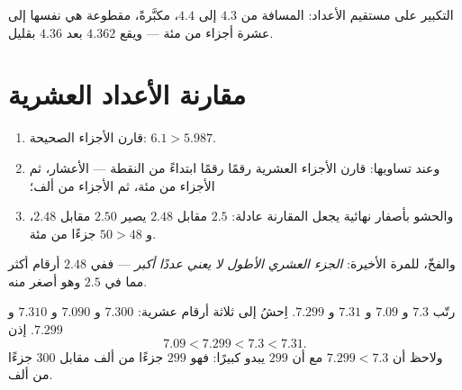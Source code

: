 \begin{omfigure}

{\small التكبير على مستقيم الأعداد: المسافة من $4.3$ إلى $4.4$،
مكبَّرةً، مقطوعة هي نفسها إلى عشرة أجزاء من مئة --- ويقع $4.362$
بعد $4.36$ بقليل.}
\end{omfigure}

\section{مقارنة الأعداد العشرية}

\begin{method}\label{met:g5:decimals:compare}
\begin{enumerate}
  \item قارن الأجزاء الصحيحة: $6.1 > 5.987$.
  \item وعند تساويها: قارن الأجزاء العشرية رقمًا رقمًا
        ابتداءً من النقطة --- الأعشار، ثم الأجزاء من مئة، ثم
        الأجزاء من ألف؛
  \item والحشو بأصفار نهائية يجعل المقارنة عادلة:
        $2.5$ مقابل $2.48$ يصير $2.50$ مقابل $2.48$، و $50 > 48$
        جزءًا من مئة.
\end{enumerate}
والفخّ، للمرة الأخيرة: \emph{الجزء العشري الأطول لا يعني عددًا
أكبر} --- ففي $2.48$ أرقام أكثر مما في $2.5$ وهو أصغر منه.
\end{method}

\begin{example}\label{ex:g5:decimals:order}
رتّب $7.3$ و $7.09$ و $7.31$ و $7.299$. اِحشُ إلى ثلاثة أرقام
عشرية: $7.300$ و $7.090$ و $7.310$ و $7.299$. إذن
\[
7.09 < 7.299 < 7.3 < 7.31 .
\]
ولاحظ أن $7.299 < 7.3$ مع أن $299$ يبدو كبيرًا: فهو $299$ جزءًا
من ألف مقابل $300$ جزءًا من ألف.
\end{example}

